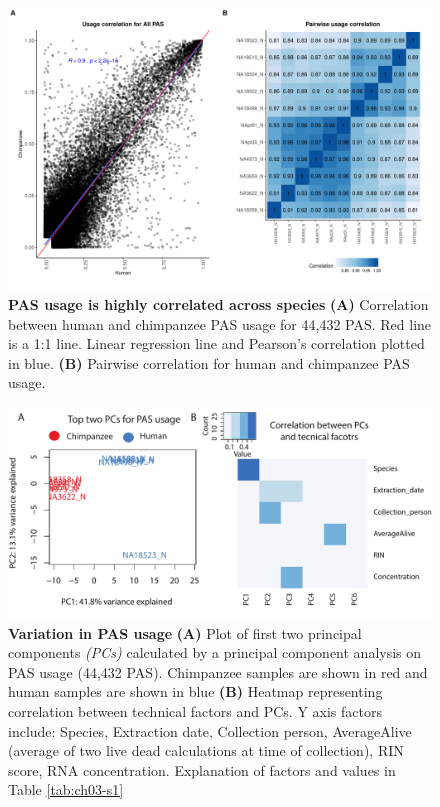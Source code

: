 \begin{figure}[!htb]
\centering
\includegraphics[width=5in]{img/ch03/Fig1-figSup3.pdf}
\caption[PAS usage is highly correlated across species]{\textbf{PAS usage is highly correlated across species} {\bf (A)}  Correlation between human and chimpanzee PAS usage for 44,432 PAS. Red line is a 1:1 line. Linear regression line and Pearson's correlation plotted in blue. {\bf (B)}  Pairwise correlation for human and chimpanzee PAS usage.}
\label{fig:ch03-UsageCorr}
\end{figure}
\clearpage

\begin{figure}[!htb]
\centering
\includegraphics[width=5in]{img/ch03/Fig1-figSup4.pdf}
\caption[Variation in PAS usage]{\textbf{Variation in PAS usage} {\bf (A)}  Plot of first two principal components \emph{(PCs)} calculated by a principal component analysis on PAS usage (44,432 PAS). Chimpanzee samples are shown in red and human samples are shown in blue {\bf (B)}  Heatmap representing correlation between technical factors and PCs. Y axis factors include: Species, Extraction date, Collection person, AverageAlive (average of two live dead calculations at time of collection), RIN score, RNA concentration. Explanation of factors and values in Table \ref{tab:ch03-s1}}
\label{fig:ch03-PCAthreeprime}
\end{figure}
\clearpage


